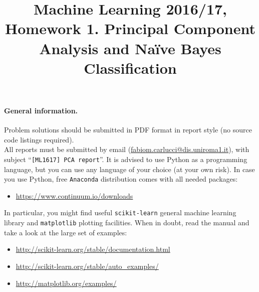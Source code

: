 \documentclass{article}
\title{Machine Learning 2016/17, Homework 1. Principal Component Analysis and Na\"{i}ve Bayes Classification}
\begin{document}
\maketitle

\paragraph{General information.} Problem solutions should be submitted in PDF format in report style (no source code listings required). \\
All reports must be submitted by email (\url{fabiom.carlucci@dis.uniroma1.it}), with subject ``\verb![ML1617] PCA report!''.
It is advised to use Python as a programming language, but you can use any language of your choice (at your own risk).
In case you use Python, free \verb!Anaconda! distribution comes with all needed packages:
\begin{itemize}
\item[] \url{https://www.continuum.io/downloads}
\end{itemize}
In particular, you might find useful \verb!scikit-learn! general machine learning library and \verb!matplotlib! plotting facilities. When in doubt, read the manual and take a look at the large set of examples:
\begin{itemize}
\item[] \url{http://scikit-learn.org/stable/documentation.html}
\item[] \url{http://scikit-learn.org/stable/auto_examples/}
\item[] \url{http://matplotlib.org/examples/}
\end{itemize}
\end{document}
